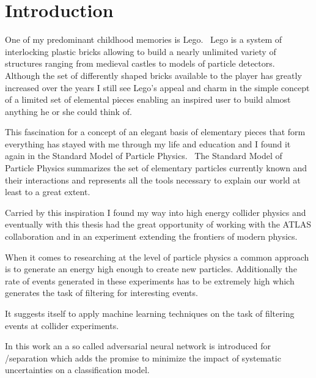 

\chapter{Introduction}
\label{sec:intro}

One of my predominant childhood memories is Lego\textsuperscript{\textregistered}.~\cite{lego} Lego is a system of interlocking plastic bricks allowing to build a nearly unlimited variety of structures ranging from medieval castles to models of particle detectors.~\cite{atlas_lego} Although the set of differently shaped bricks available to the player has greatly increased over the years I still see Lego's appeal and charm in the simple concept of a limited set of elemental pieces enabling an inspired user to build almost anything he or she could think of.

This fascination for a concept of an elegant basis of elementary pieces that form everything has stayed with me through my life and education and I found it again in the Standard Model of Particle Physics.~\cite{thomson}
The Standard Model of Particle Physics summarizes the set of elementary particles currently known and their interactions and represents all the tools necessary to explain our world at least to a great extent.

Carried by this inspiration I found my way into high energy collider physics and eventually with this thesis had the great opportunity of working with the ATLAS collaboration and in an experiment extending the frontiers of modern physics.

When it comes to researching at the level of particle physics a common approach is to generate an energy high enough to create new particles. Additionally the rate of events generated in these experiments has to be extremely high which generates the task of filtering for interesting events.

It suggests itself to apply machine learning techniques on the task of filtering events at collider experiments.

In this work an a so called adversarial neural network is introduced for \tW/\ttbar separation which adds the promise to minimize the impact of systematic uncertainties on a classification model.

